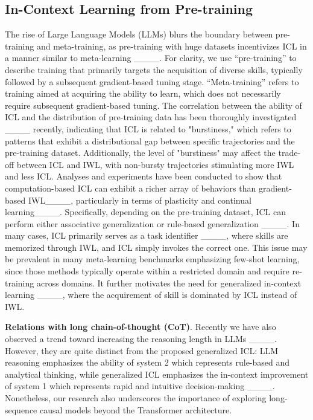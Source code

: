 \subsection{In-Context Learning from Pre-training}
The rise of Large Language Models (LLMs) blurs the boundary between pre-training and meta-training, as pre-training with huge datasets incentivizes ICL in a manner similar to meta-learning ____. For clarity, we use ``pre-training'' to describe training that primarily targets the acquisition of diverse skills, typically followed by a subsequent gradient-based tuning stage. ``Meta-training'' refers to training aimed at acquiring the ability to learn, which does not necessarily require subsequent gradient-based tuning.
The correlation between the ability of ICL and the distribution of pre-training data has been thoroughly investigated ____ recently, indicating that ICL is related to "burstiness," which refers to patterns that exhibit a distributional gap between specific trajectories and the pre-training dataset.
Additionally, the level of "burstiness" may affect the trade-off between ICL and IWL, with non-bursty trajectories stimulating more IWL and less ICL.
Analyses and experiments have been conducted to show that computation-based ICL can exhibit a richer array of behaviors than gradient-based IWL____, particularly in terms of plasticity and continual learning____.
Specifically, depending on the pre-training dataset, ICL can perform either associative generalization or rule-based generalization ____. In many cases, ICL primarily serves as a task identifier ____, where skills are memorized through IWL, and ICL simply invokes the correct one. 
This issue may be prevalent in many meta-learning benchmarks emphasizing few-shot learning, since those methods typically operate within a restricted domain and require re-training across domains. 
It further motivates the need for generalized in-context learning ____, where the acquirement of skill is dominated by ICL instead of IWL.

\textbf{Relations with long chain-of-thought (CoT)}. Recently we have also observed a trend toward increasing the reasoning length in LLMs ____. However, they are quite distinct from the proposed generalized ICL: LLM reasoning emphasizes the ability of system 2 which represents rule-based and analytical thinking, while generalized ICL emphasizes the in-context improvement of system 1 which represents rapid and intuitive decision-making ____. Nonetheless, our research also underscores the importance of exploring long-sequence causal models beyond the Transformer architecture.

